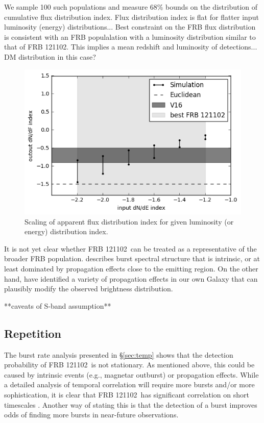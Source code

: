 \documentclass[twocolumn]{aastex61}
\newcommand{\frb}{FRB 121102}
\begin{document}
We sample 100 such populations and measure 68\% bounds on the distribution of cumulative flux distribution index.
Flux distribution index is flat for flatter input luminosity (energy) distributions...
Best constraint on the FRB flux distribution is consistent with an FRB populalation with a luminosity distribution similar to that of \frb.
This implies a mean redshift and luminosity of detections... DM distribution in this case?

\begin{figure}[htb]
\begin{center}
\includegraphics[width=0.9\columnwidth]{sim_index_scaling}
\caption{Scaling of apparent flux distribution index for given luminosity (or energy) distribution index.
\label{fig:ind}}
\end{center}
\end{figure}

It is not yet clear whether \frb\ can be treated as a representative of the broader FRB population. \citet{2016Natur.531..202S} describes burst spectral structure that is intrinsic, or at least dominated by propagation effects close to the emitting region. On the other hand, \citep{CORDES} have identified a variety of propagation effects in our own Galaxy that can plausibly modify the observed brightness distribution.

**caveats of S-band assumption**

\subsection{Repetition}
The burst rate analysis presented in \S \ref{sec:temp} shows that the detection probability of \frb\ is not stationary. As mentioned above, this could be caused by intrinsic events (e.g., magnetar outburst) or propagation effects. While a detailed analysis of temporal correlation will require more bursts and/or more sophistication, it is clear that \frb\ has significant correlation on short timescales \citep[sometimes called a ``red spectrum'';][]{2016MNRAS.458L..89C}. Another way of stating this is that the detection of a burst improves odds of finding more bursts in near-future observations. 
\end{document}
